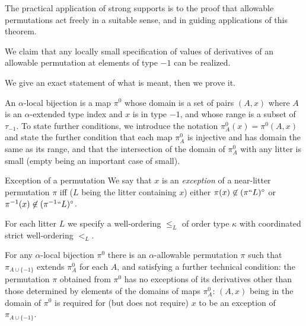 The practical application of strong supports is to the proof that allowable permutations act freely in a suitable sense, and in guiding applications of this theorem.

We claim that any locally small specification of values of derivatives of an allowable permutation at elements of type $-1$ can be realized.

We give an exact statement of what is meant, then we prove it.

\begin{description}

\begin{definition}
An $\alpha$-local bijection is a map $\pi^0$ whose domain is a set of pairs $(A,x)$ where $A$ is an $\alpha$-extended type index and $x$ is in type $-1$,  and whose range is a subset of $\tau_{-1}$.  To state further conditions, we introduce the notation $\pi^0_A(x) = \pi^0(A,x)$ and state the further condition that each map $\pi^0_A$ is injective and has domain the same as its range, and that the intersection of the domain of $\pi^0_A$ with any litter is small (empty being an important case of small).
\end{definition}

\begin{definition}{Exception of a permutation}
\label {def:perm-exception}
We say that $x$ is an {\em exception} of a near-litter permutation $\pi$ iff ($L$ being the litter containing $x$) either $\pi(x) \not\in (\pi``L)^\circ$ or $\pi^{-1}(x) \not\in ({\pi^{-1}}``L)^\circ$.
\end{definition}

\item[Stipulation:]  For each litter $L$ we specify a well-ordering $\leq_L$ of order type $\kappa$ with coordinated strict well-ordering $<_L$.

\begin{theorem}
\label {freedom-of-action}
For any $\alpha$-local bijection $\pi^0$ there is an $\alpha$-allowable permutation $\pi$ such that
$\pi_{A\cup \{-1\}}$ extends $\pi^0_A$ for each $A$, and satisfying a further technical condition:  the permutation $\pi$ obtained from $\pi^0$ has no exceptions of its derivatives other than those determined by elements of the domains of maps $\pi^0_A$:  $(A,x)$ being in the domain of $\pi^0$ is required for (but does not require) $x$ to be an exception of $\pi_{A \cup \{-1\}}$.
\end{theorem}


\end{description}
